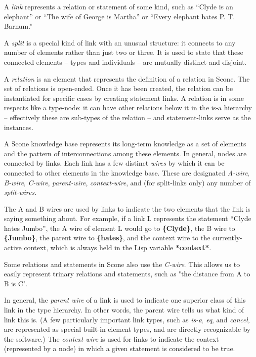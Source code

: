 \documentclass[titlepage,twoside,openright,11pt]{article}
\begin{document}
A \emph{link} represents a relation or statement of some kind, such as
``Clyde is an elephant'' or ``The wife of George is Martha'' or ``Every
elephant hates P. T. Barnum.''

A \emph{split} is a special kind of link with an unusual structure: it
connects to any number of elements rather than just two or three. It is
used to state that these connected elements -- types and individuals --
are mutually distinct and disjoint.

A \emph{relation} is an element that represents the definition of a
relation in Scone. The set of relations is open-ended. Once it has been
created, the relation can be instantiated for specific cases by creating
statement links. A relation is in some respects like a type-node: it can
have other relations below it in the is-a hierarchy -- effectively these
are sub-types of the relation -- and statement-links serve as the
instances.

A Scone knowledge base represents its long-term knowledge as a set of
elements and the pattern of interconnections among these elements. In
general, nodes are connected by links. Each link has a few distinct
\emph{wires} by which it can be connected to other elements in the
knowledge base. These are designated \emph{A-wire}, \emph{B-wire},
\emph{C-wire}, \emph{parent-wire}, \emph{context-wire}, and (for
split-links only) any number of \emph{split-wires}.

The A and B wires are used by links to indicate the two elements that
the link is saying something about. For example, if a link L represents
the statement ``Clyde hates Jumbo'', the A wire of element L would go to
\textbf{\{Clyde\}}, the B wire to \textbf{\{Jumbo\}}, the parent wire to
\textbf{\{hates\}}, and the context wire to the currently-active
context, which is always held in the Lisp variable \textbf{*context*}.

Some relations and statements in Scone also use the \emph{C-wire}. This
allows us to easily represent trinary relations and statements, such as
"the distance from A to B is C".

In general, the \emph{parent wire} of a link is used to indicate one
superior class of this link in the type hierarchy. In other words, the
parent wire tells us what kind of link this is. (A few particularly
important link types, such as \emph{is-a}, \emph{eq}, and \emph{cancel},
are represented as special built-in element types, and are directly
recognizable by the software.) The \emph{context wire} is used for links
to indicate the context (represented by a node) in which a given
statement is considered to be true.
\end{document}
